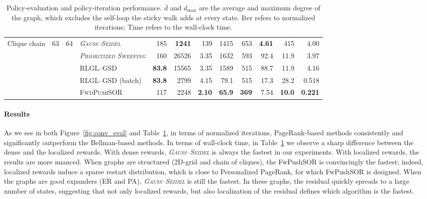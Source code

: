 \documentclass[letterpaper, 10 pt, conference]{ieeeconf}
\begin{document}
\begin{table}[t]
\begin{tabular}{@{}lcclrrrrrrrr@{}}
Clique chain & 63 & 64
& \textit{\textsc{Gauss--Seidel}}
& 185 & \textbf{1241} & 139 & 1415
& 653 & \textbf{4.61} & 415 & 4.00 \\
& &
& \textit{\textsc{Prioritized Sweeping}}
& 160 & 26526 & 3.35 & 1632
& 593 & 92.4 & 11.9 & 3.97 \\
& &
& \textsc{RLGL--GSD}
& \textbf{83.8} & 15565 & 3.35 & 1589
& 515 & 88.7 & 11.9 & 4.16 \\
& &
& \textsc{RLGL--GSD} (batch)
& \textbf{83.8} & 2799 & 4.15 & 79.1
& 515 & 17.3 & 28.2 & 0.518 \\
& &
& \textsc{FwdPushSOR}
& 117 & 2248 & \textbf{2.10} & \textbf{65.9}
& \textbf{369} & 7.54 & \textbf{10.0} & \textbf{0.221} \\
\bottomrule
\end{tabular}
\caption{Policy-evaluation and policy-iteration performance. $\bar d$ and
$d_{\max}$ are the average and maximum degree of the graph, which excludes the
self-loop the sticky walk adds at every state. Iter refers to normalized
iterations; Time refers to the wall-clock time.}
\label{tab:eval_and_pi}
\end{table}
\paragraph{Results}
As we see in both Figure~\ref{fig:conv_eval} and Table~\ref{tab:eval_and_pi}, in terms of normalized iterations, PageRank-based methods consistently and significantly outperform the Bellman-based methods. In terms of wall-clock time, in Table~\ref{tab:eval_and_pi} we observe a sharp difference between the dense and the localized rewards. With dense rewards, \textit{\textsc{Gauss--Seidel}} is always the fastest in our experiments. With localized rewards, the results are more nuanced. When graphs are structured (2D-grid and chain of cliques), the {\sc FwPushSOR} is convincingly the fastest; indeed, localized rewards induce a sparse restart distribution, which is close to Personalized PageRank, for which {\sc FwPushSOR} is designed. When the graphs are good expanders (ER and PA), \textit{\textsc{Gauss--Seidel}} is still the fastest. In these graphs, the residual quickly spreads to a large number of states, suggesting that not only localized rewards, but also localization of the residual defines which algorithm is the fastest. 
\end{document}
